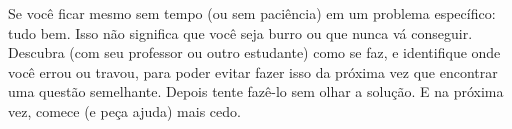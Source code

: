 \documentclass[../../../include/open-logic-section]{subfiles}
\begin{document}
Se você ficar mesmo sem tempo (ou sem paciência) em um problema
específico: tudo bem. Isso não significa que você seja burro ou que
nunca vá conseguir. Descubra (com seu professor ou outro estudante) como
se faz, e identifique onde você errou ou travou, para poder evitar fazer
isso da próxima vez que encontrar uma questão semelhante.  Depois tente
fazê-lo sem olhar a solução.  E na próxima vez, comece (e peça ajuda)
mais cedo.
\end{document}
